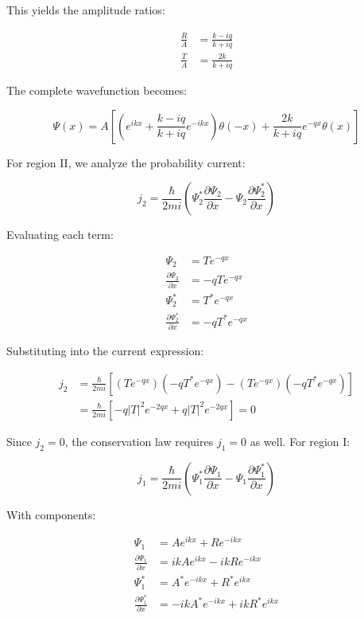 This yields the amplitude ratios:

\begin{align}
\frac{R}{A} & =\frac{k-i q}{k+i q} \\
\frac{T}{A} & =\frac{2 k}{k+i q}
\end{align}

The complete wavefunction becomes:

\begin{equation}
\Psi(x)=A\left[\left(e^{i k x}+\frac{k-i q}{k+i q} e^{-i k x}\right) \theta(-x)+\frac{2 k}{k+i q} e^{-q x} \theta(x)\right]
\end{equation}

For region II, we analyze the probability current:

\begin{equation}
j_{2}=\frac{\hbar}{2 m i}\left(\Psi_{2}^{*} \frac{\partial \Psi_{2}}{\partial x}-\Psi_{2} \frac{\partial \Psi_{2}^{*}}{\partial x}\right)
\end{equation}

Evaluating each term:

\begin{align}
\Psi_{2} & =T e^{-q x} \\
\frac{\partial \Psi_{2}}{\partial x} & =-q T e^{-q x} \\
\Psi_{2}^{*} & =T^{*} e^{-q x}  \\
\frac{\partial \Psi_{2}^{*}}{\partial x} & =-q T^{*} e^{-q x}
\end{align}

Substituting into the current expression:

\begin{align}
j_{2} & =\frac{\hbar}{2 m i}\left[\left(T e^{-q x}\right)\left(-q T^{*} e^{-q x}\right)-\left(T e^{-q x}\right)\left(-q T^{*} e^{-q x}\right)\right] \\
& =\frac{\hbar}{2 m i}\left[-q|T|^{2} e^{-2 q x}+q|T|^{2} e^{-2 q x}\right]=0
\end{align}

Since $j_2 = 0$, the conservation law requires $j_1 = 0$ as well. For region I:

\begin{equation}
j_{1}=\frac{\hbar}{2 m i}\left(\Psi_{1}^{*} \frac{\partial \Psi_{1}}{\partial x}-\Psi_{1} \frac{\partial \Psi_{1}^{*}}{\partial x}\right)
\end{equation}

With components:

\begin{align}
\Psi_{1} & =A e^{i k x}+R e^{-i k x} \\
\frac{\partial \Psi_{1}}{\partial x} & =i k A e^{i k x}-i k R e^{-i k x}  \\
\Psi_{1}^{*} & =A^{*} e^{-i k x}+R^{*} e^{i k x} \\
\frac{\partial \Psi_{1}^{*}}{\partial x} & =-i k A^{*} e^{-i k x}+i k R^{*} e^{i k x}
\end{align}

